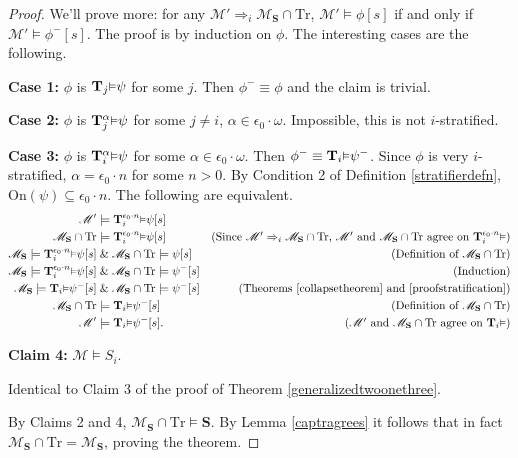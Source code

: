 \documentclass[reqno]{article}
\theoremstyle{definition}
\def\M{\mathscr{M}}
\def\T{\mathbf{T}}
\def\S{\mathbf{S}}
\def\epom{\epsilon_0\cdot\omega}
\def\onset{\mathrm{On}}
\def\Tr{\mathrm{Tr}}
\def\ctr{\cap\Tr}
\def\myequiv{\Rightarrow}
\renewcommand{\Pr}[1]{\T_{#1}\mbox{\small${\vDash}$}}
\newcommand{\Prr}[2]{\T^{#1}_{#2}\mbox{\small${\vDash}$}}
\newcommand{\case}[1]{\textbf{Case #1:}}
\newcommand{\claim}[1]{\textbf{Claim #1:}}
\begin{document}
\begin{proof}
\item
We'll prove more: for any $\M'\myequiv_i \M_\S\ctr$, $\M'\models\phi[s]$ if and only if $\M'\models\phi^-[s]$.
The proof is by induction on $\phi$.  The interesting cases are the following.

\item
\case1
$\phi$ is $\Pr j\psi$ for some $j$.  Then $\phi^-\equiv \phi$ and the claim is trivial.

\item\case2
$\phi$ is $\Prr\alpha j\psi$ for some $j\not=i$, $\alpha\in\epom$.  Impossible, this is not $i$-stratified.

\item\case3
$\phi$ is $\Prr\alpha i\psi$ for some $\alpha\in\epom$.
Then $\phi^-\equiv\Pr i\psi^-$.
Since $\phi$ is very $i$-stratified, $\alpha=\epsilon_0\cdot n$ for some $n>0$.
By Condition 2 of Definition \ref{stratifierdefn}, $\onset(\psi)\subseteq \epsilon_0\cdot n$.
The following are equivalent.
\begin{align*}
\M' &\models \Prr{\epsilon_0\cdot n}i\psi[s]\\
\M_\S\ctr &\models \Prr{\epsilon_0\cdot n}i\psi[s]
  &\mbox{(Since $\M'\myequiv_i\M_\S\ctr$, $\M'$ and $\M_\S\ctr$ agree on $\Prr{\epsilon_0\cdot n}i$)}\\
\M_\S\models \Prr{\epsilon_0\cdot n}i\psi[s] &\mathrel\& \M_\S\ctr\models\psi[s]
  &\mbox{(Definition of $\M_\S\ctr$)}\\
\M_\S\models \Prr{\epsilon_0\cdot n}i\psi[s] &\mathrel\& \M_\S\ctr\models\psi^-[s]
  &\mbox{(Induction)}\\
\M_\S\models \Pr i\psi^-[s] &\mathrel\& \M_\S\ctr\models\psi^-[s]
  &\mbox{(Theorems \ref{collapsetheorem} and \ref{proofstratification})}\\
\M_\S\ctr &\models \Pr i\psi^-[s]
  &\mbox{(Definition of $\M_\S\ctr$)}\\
\M' &\models \Pr i\psi^-[s].
  &\mbox{($\M'$ and $\M_\S\ctr$ agree on $\Pr i$)}
\end{align*}

\item
\claim4
$\M\models S_i$.

\item
Identical to Claim 3 of the proof of Theorem \ref{generalizedtwoonethree}.

\item
By Claims 2 and 4, $\M_\S\ctr\models \S$.
By Lemma \ref{captragrees} it follows that in fact $\M_\S\ctr=\M_\S$, proving the theorem.
\end{proof}
\end{document}
